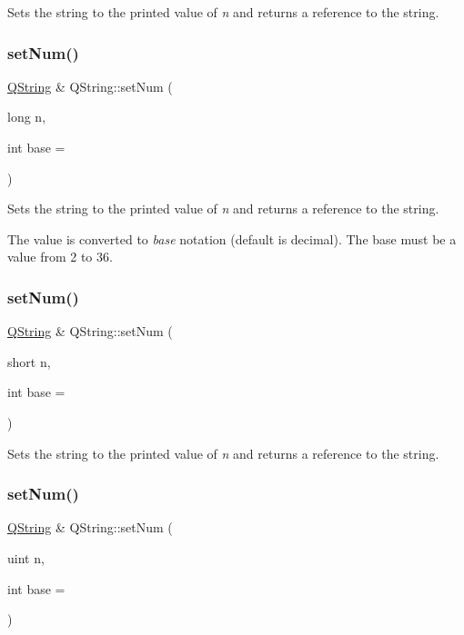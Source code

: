 Sets the string to the printed value of {\itshape n} and returns a reference to the string. \mbox{\label{class_q_string_a8258f5a8bf47b4690bc7ea8790dcdb73}} 
\subsubsection{\texorpdfstring{setNum()}{setNum()}\hspace{0.1cm}{\footnotesize\ttfamily [4/8]}}
{\footnotesize\ttfamily \mbox{\hyperlink{class_q_string}{Q\+String}} \& Q\+String\+::set\+Num (\begin{DoxyParamCaption}\item[{long}]{n,  }\item[{int}]{base = {} }\end{DoxyParamCaption})}

Sets the string to the printed value of {\itshape n} and returns a reference to the string.

The value is converted to {\itshape base} notation (default is decimal). The base must be a value from 2 to 36. \mbox{\label{class_q_string_accbb06e3141abc70c20ccee59a20b1f5}} 
\subsubsection{\texorpdfstring{setNum()}{setNum()}\hspace{0.1cm}{\footnotesize\ttfamily [5/8]}}
{\footnotesize\ttfamily \mbox{\hyperlink{class_q_string}{Q\+String}} \& Q\+String\+::set\+Num (\begin{DoxyParamCaption}\item[{short}]{n,  }\item[{int}]{base = {} }\end{DoxyParamCaption})\hspace{0.3cm}{\ttfamily [inline]}}

Sets the string to the printed value of {\itshape n} and returns a reference to the string. \mbox{\label{class_q_string_adc4a9618d3977b917fb7e83135b0a4e9}} 
\subsubsection{\texorpdfstring{setNum()}{setNum()}\hspace{0.1cm}{\footnotesize\ttfamily [6/8]}}
{\footnotesize\ttfamily \mbox{\hyperlink{class_q_string}{Q\+String}} \& Q\+String\+::set\+Num (\begin{DoxyParamCaption}\item[{uint}]{n,  }\item[{int}]{base = {} }\end{DoxyParamCaption})\hspace{0.3cm}{\ttfamily [inline]}}

